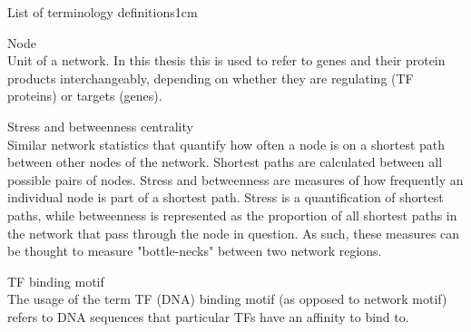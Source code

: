 \begin{mclistof}{List of terminology definitions}{1cm}
\item[Node] \hfill \\  Unit of a network. In this thesis this is used to refer to genes and their protein products interchangeably, depending on whether they are regulating (TF proteins) or targets (genes).

\item[Stress and betweenness centrality] \hfill \\  Similar network statistics that quantify how often a node is on a shortest path between other nodes of the network. Shortest paths are calculated between all possible pairs of nodes. Stress and betweenness are measures of how frequently an individual node is part of a shortest path. Stress is a quantification of shortest paths, while betweenness is represented as the proportion of all shortest paths in the network that pass through the node in question. As such, these measures can be thought to measure "bottle-necks" between two network regions.

\item[TF binding motif] \hfill \\  The usage of the term TF (DNA) binding motif (as opposed to network motif) refers to DNA sequences that particular TFs have an affinity to bind to. 

\end{mclistof} 


